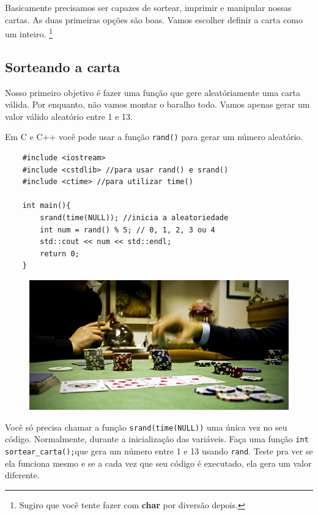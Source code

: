 \documentclass[12pt]{article}
\newcommand{\code}[1]{\lstinline|#1|} %
\newcommand{\bold}[1]{\textbf{#1}} %
\begin{document}
Basicamente precisamos ser capazes de sortear, imprimir e manipular nossas
cartas.  As duas primeiras opções são boas. Vamos escolher definir a carta como
um inteiro.  \footnote{Sugiro que você tente fazer com \bold{char} por diversão
depois.}

\subsection{Sorteando a carta}

Nosso primeiro objetivo é fazer uma função que gere aleatóriamente uma carta
válida.  Por enquanto, não vamos montar o baralho todo. Vamos apenas gerar um
valor válido aleatório entre 1 e 13.

Em C e C++ você pode usar a função \code{rand()} para gerar um número aleatório.

\begin{mdframed}[nobreak=true]
	\begin{lstlisting}
	#include <iostream>
	#include <cstdlib> //para usar rand() e srand()
	#include <ctime> //para utilizar time()

	int main(){
		srand(time(NULL)); //inicia a aleatoriedade
		int num = rand() % 5; // 0, 1, 2, 3 ou 4
		std::cout << num << std::endl;
		return 0;
	}
	\end{lstlisting}
\end{mdframed}

\begin{figure}[h]
	\centering
	\includegraphics{imagens/mesa}
\end{figure}

Você só precisa chamar a função \code{srand(time(NULL))} uma única vez no seu
código. Normalmente, durante a inicialização das variáveis. Faça uma função
\code{int sortear_carta();}que gera um número entre 1 e 13 usando \code{rand}.
Teste pra ver se ela funciona mesmo e se a cada vez que seu código é executado,
ela gera um valor diferente.
\end{document}

